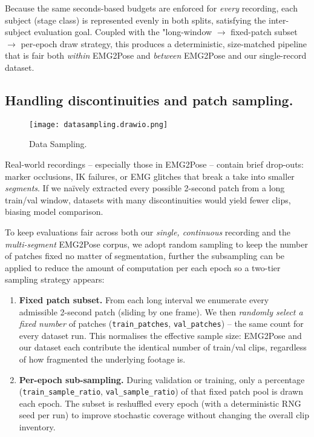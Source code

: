 Because the same seconds-based budgets are enforced for \emph{every} recording, each subject (stage class) is represented evenly in both splits, satisfying the inter-subject evaluation goal. Coupled with the "long-window $\to$ fixed-patch subset $\to$ per-epoch draw strategy, this produces a deterministic, size-matched pipeline that is fair both \emph{within} EMG2Pose and \emph{between} EMG2Pose and our single-record dataset.

\subsection{Handling discontinuities and patch sampling.}

\begin{figure}[H]
    \centering
    \texttt{[image: datasampling.drawio.png]}
    \caption{Data Sampling.}
    \label{fig:datasampling}
\end{figure}

Real-world recordings -- especially those in EMG2Pose -- contain brief drop-outs:
marker occlusions, IK failures, or EMG glitches that break a take into smaller \emph{segments}.
If we naïvely extracted every possible 2-second patch from a long train/val window, datasets with many discontinuities would yield fewer clips, biasing model comparison.

To keep evaluations fair across both our \emph{single, continuous} recording and the \emph{multi-segment} EMG2Pose corpus, we adopt random sampling to keep the number of patches fixed no matter of segmentation, further the subsampling can be applied to reduce the amount of computation per each epoch so a two-tier sampling strategy appears:

\begin{enumerate}[label=\arabic*.]
  \item \textbf{Fixed patch subset.}
        From each long interval we enumerate every admissible 2-second patch
        (sliding by one frame).
        We then \emph{randomly select a fixed number} of patches
        (\texttt{train\_patches}, \texttt{val\_patches}) -- the same count for
        every dataset run.
        This normalises the effective sample size: EMG2Pose and our dataset
        each contribute the identical number of train/val clips, regardless of
        how fragmented the underlying footage is.

  \item \textbf{Per-epoch sub-sampling.}
        During validation or training, only a percentage
        (\texttt{train\_sample\_ratio}, \texttt{val\_sample\_ratio}) of that
        fixed patch pool is drawn each epoch.
        The subset is reshuffled every epoch (with a deterministic RNG seed per
        run) to improve stochastic coverage without changing the overall clip
        inventory.

\end{enumerate}

